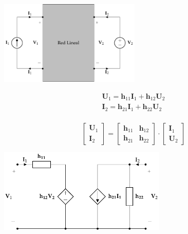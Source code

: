 \documentclass[10pt]{article}
\begin{document}
\begin{minipage}{0.5\textwidth}
  \begin{center}
    \includegraphics[height=4cm]{../figs/cuadripolo_hibrido.pdf}
  \end{center}
\end{minipage}
\begin{minipage}{0.5\textwidth}
  \[
    \begin{array}{l}
      \mathbf{U}_1 = \mathbf{h}_{11} \mathbf{I}_1 + \mathbf{h}_{12} \mathbf{U}_2\\
      \mathbf{I}_2 = \mathbf{h}_{21} \mathbf{I}_1 + \mathbf{h}_{22} \mathbf{U}_2\\
    \end{array}
  \]

  \[
    \left[
      \begin{array}{c}
        \mathbf{U}_1\\
        \mathbf{I}_2
      \end{array}
    \right] =
    \left[
      \begin{array}{cc}
        \mathbf{h}_{11} & \mathbf{h}_{12}\\
        \mathbf{h}_{21} & \mathbf{h}_{22}
      \end{array}
    \right] \cdot
    \left[
      \begin{array}{c}
        \mathbf{I}_1\\
        \mathbf{U}_2
      \end{array}
    \right]
  \]
\end{minipage}

\begin{center}
\includegraphics[height=4cm]{../figs/circuitoEquivalenteH.pdf}
\end{center}
\end{document}
